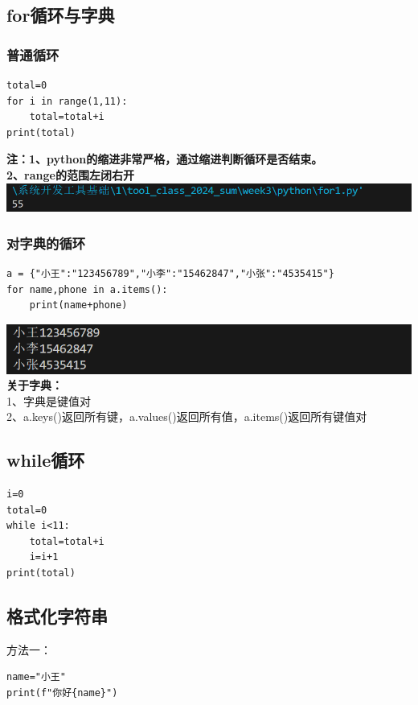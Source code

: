 \documentclass[UTF8,a4paper]{ctexart}
\begin{document}
\subsection{for循环与字典}
\subsubsection{普通循环}
\begin{lstlisting}
total=0
for i in range(1,11):
    total=total+i
print(total)
\end{lstlisting}
\textbf{注：1、python的缩进非常严格，通过缩进判断循环是否结束。}\\
\textbf{2、range的范围左闭右开}\\
\includegraphics[width=1\textwidth]{./python/for1.png}

\subsubsection{对字典的循环}
\begin{lstlisting}
a = {"小王":"123456789","小李":"15462847","小张":"4535415"}
for name,phone in a.items():
    print(name+phone)
\end{lstlisting}
\includegraphics[width=1\textwidth]{./python/for2.png}
\textbf{关于字典：}\\
1、字典是键值对\\
2、a.keys()返回所有键，a.values()返回所有值，a.items()返回所有键值对

\subsection{while循环}
\begin{lstlisting}
i=0
total=0
while i<11:
    total=total+i
    i=i+1
print(total)
\end{lstlisting}

\subsection{格式化字符串}
方法一：
\begin{lstlisting}
name="小王"
print(f"你好{name}")
\end{lstlisting}
\end{document}
